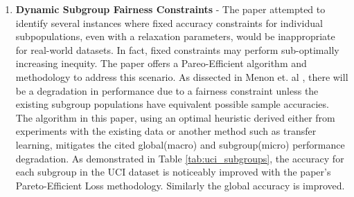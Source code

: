 \begin{enumerate}
    \item \textbf{Dynamic Subgroup Fairness Constraints}  - The paper attempted to identify several instances where fixed accuracy constraints for individual subpopulations, even with a relaxation parameters, would be inappropriate for real-world datasets. In fact, fixed constraints may perform sub-optimally increasing inequity. The paper offers a Pareo-Efficient algorithm and methodology to address this scenario. As dissected in Menon et. al \cite{Menon2018TheCO}, there will be a degradation in performance due to a fairness constraint unless the existing subgroup populations have equivalent possible sample accuracies. The algorithm in this paper, using an optimal heuristic derived either from experiments with the existing data or another method such as transfer learning, mitigates the cited global(macro) and subgroup(micro) performance degradation.  As demonstrated in Table \ref{tab:uci_subgroups}, the accuracy for each subgroup  in the UCI dataset is noticeably improved with the paper's Pareto-Efficient Loss methodology. Similarly the global accuracy is improved. 
 \end{enumerate}
   
 
 
 
 
 
    

    
